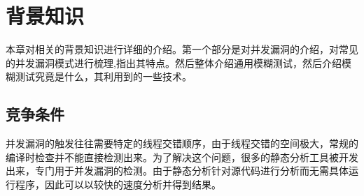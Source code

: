 \section{背景知识}



本章对相关的背景知识进行详细的介绍。第一个部分是对并发漏洞的介绍，对常见的并发漏洞模式进行梳理,指出其特点。然后整体介绍通用模糊测试，然后介绍模糊测试究竟是什么，其利用到的一些技术。

\subsection{竞争条件}



并发漏洞的触发往往需要特定的线程交错顺序，由于线程交错的空间极大，常规的编译时检查并不能直接检测出来。为了解决这个问题，很多的静态分析工具被开发出来，专门用于并发漏洞的检测。由于静态分析针对源代码进行分析而无需具体运行程序，因此可以以较快的速度分析并得到结果。